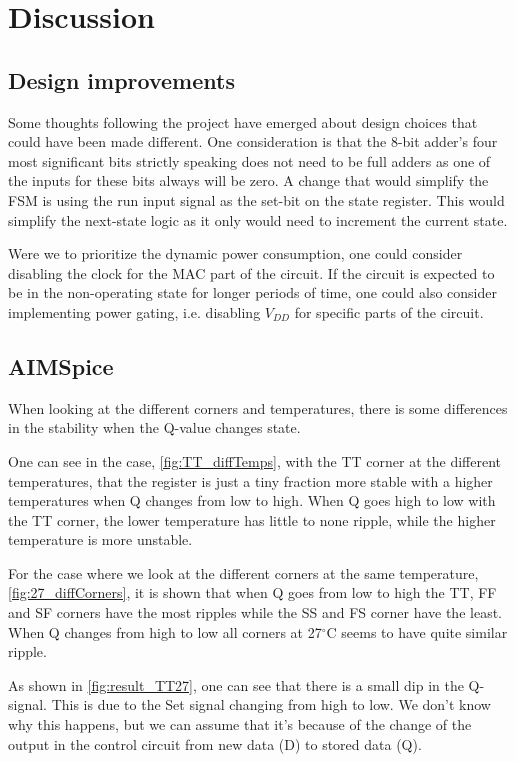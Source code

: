 \section{Discussion}
\label{sec: Discussion}

\subsection{Design improvements}

Some thoughts following the project have emerged about design choices that could have been made different. One consideration is that the 8-bit adder's four most significant bits strictly speaking does not need to be full adders as one of the inputs for these bits always will be zero. A change that would simplify the FSM is using the run input signal as the set-bit on the state register. This would simplify the next-state logic as it only would need to increment the current state.

Were we to prioritize the dynamic power consumption, one could consider disabling the clock for the MAC part of the circuit. If the circuit is expected to be in the non-operating state for longer periods of time, one could also consider implementing power gating, i.e. disabling $V_{DD}$ for specific parts of the circuit.

\subsection{AIMSpice}

When looking at the different corners and temperatures, there is some differences in the stability when the Q-value changes state. 

One can see in the case, \autoref{fig:TT_diffTemps}, with the TT corner at the different temperatures, that the register is just a tiny fraction more stable with a higher temperatures when Q changes from low to high. When Q goes high to low with the TT corner, the lower temperature has little to none ripple, while the higher temperature is more unstable. 

For the case where we look at the different corners at the same temperature, \autoref{fig:27_diffCorners}, it is shown that when Q goes from low to high the TT, FF and SF corners have the most ripples while the SS and FS corner have the least. When Q changes from high to low all corners at 27$^\circ$C seems to have quite similar ripple. 

As shown in \autoref{fig:result_TT27}, one can see that there is a small dip in the Q-signal. This is due to the Set signal changing from high to low. We don't know why this happens, but we can assume that it's because of the change of the output in the control circuit from new data (D) to stored data (Q).

